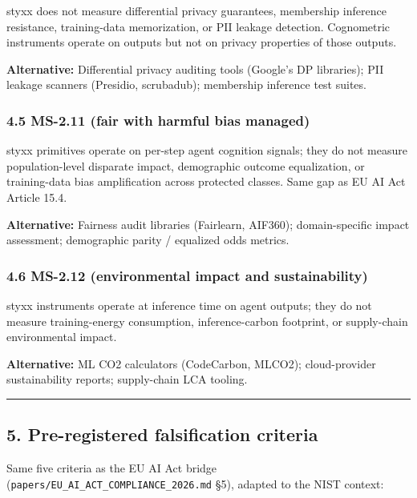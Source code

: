 \documentclass[
]{article}
\begin{document}
styxx does not measure differential privacy guarantees, membership
inference resistance, training-data memorization, or PII leakage
detection. Cognometric instruments operate on outputs but not on privacy
properties of those outputs.

\textbf{Alternative:} Differential privacy auditing tools (Google's DP
libraries); PII leakage scanners (Presidio, scrubadub); membership
inference test suites.

\subsubsection{4.5 MS-2.11 (fair with harmful bias
managed)}\label{ms-2.11-fair-with-harmful-bias-managed}

styxx primitives operate on per-step agent cognition signals; they do
not measure population-level disparate impact, demographic outcome
equalization, or training-data bias amplification across protected
classes. Same gap as EU AI Act Article 15.4.

\textbf{Alternative:} Fairness audit libraries (Fairlearn, AIF360);
domain-specific impact assessment; demographic parity / equalized odds
metrics.

\subsubsection{4.6 MS-2.12 (environmental impact and
sustainability)}\label{ms-2.12-environmental-impact-and-sustainability}

styxx instruments operate at inference time on agent outputs; they do
not measure training-energy consumption, inference-carbon footprint, or
supply-chain environmental impact.

\textbf{Alternative:} ML CO2 calculators (CodeCarbon, MLCO2);
cloud-provider sustainability reports; supply-chain LCA tooling.

\begin{center}\rule{0.5\linewidth}{0.5pt}\end{center}

\subsection{5. Pre-registered falsification
criteria}\label{pre-registered-falsification-criteria}

Same five criteria as the EU AI Act bridge
(\texttt{papers/EU\_AI\_ACT\_COMPLIANCE\_2026.md} §5), adapted to the
NIST context:
\end{document}
